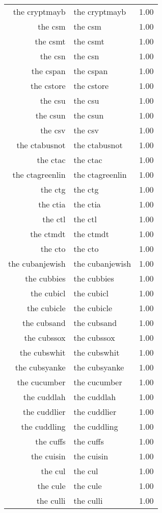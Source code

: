 \begin{table}[ht]
\begin{tabular}{rlr}
  the cryptmayb & the cryptmayb & 1.00 \\ 
  the csm & the csm & 1.00 \\ 
  the csmt & the csmt & 1.00 \\ 
  the csn & the csn & 1.00 \\ 
  the cspan & the cspan & 1.00 \\ 
  the cstore & the cstore & 1.00 \\ 
  the csu & the csu & 1.00 \\ 
  the csun & the csun & 1.00 \\ 
  the csv & the csv & 1.00 \\ 
  the ctabusnot & the ctabusnot & 1.00 \\ 
  the ctac & the ctac & 1.00 \\ 
  the ctagreenlin & the ctagreenlin & 1.00 \\ 
  the ctg & the ctg & 1.00 \\ 
  the ctia & the ctia & 1.00 \\ 
  the ctl & the ctl & 1.00 \\ 
  the ctmdt & the ctmdt & 1.00 \\ 
  the cto & the cto & 1.00 \\ 
  the cubanjewish & the cubanjewish & 1.00 \\ 
  the cubbies & the cubbies & 1.00 \\ 
  the cubicl & the cubicl & 1.00 \\ 
  the cubicle & the cubicle & 1.00 \\ 
  the cubsand & the cubsand & 1.00 \\ 
  the cubssox & the cubssox & 1.00 \\ 
  the cubswhit & the cubswhit & 1.00 \\ 
  the cubsyanke & the cubsyanke & 1.00 \\ 
  the cucumber & the cucumber & 1.00 \\ 
  the cuddlah & the cuddlah & 1.00 \\ 
  the cuddlier & the cuddlier & 1.00 \\ 
  the cuddling & the cuddling & 1.00 \\ 
  the cuffs & the cuffs & 1.00 \\ 
  the cuisin & the cuisin & 1.00 \\ 
  the cul & the cul & 1.00 \\ 
  the cule & the cule & 1.00 \\ 
  the culli & the culli & 1.00 \\ 

\end{tabular}
\end{table}
